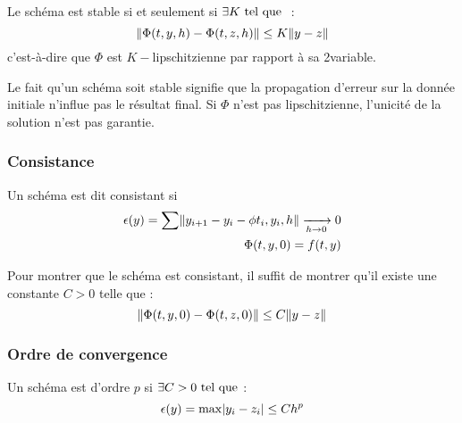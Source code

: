 			\begin{theoreme}
				Le schéma est stable si et seulement si $\exists K \text{ tel que }$ :
				\begin{equation}
					\label{eq-3-stableLip}
					\lVert \Phi(t,y,h) - \Phi(t,z,h) \rVert \leq K \lVert y-z \rVert
				\end{equation}
				c'est-à-dire que $\Phi$ est $K-$lipschitzienne par rapport à sa 2\ieme variable.
			\end{theoreme}

			Le fait qu'un schéma soit stable signifie que la propagation d'erreur sur la donnée initiale n'influe pas le résultat final. Si $\Phi$ n'est pas lipschitzienne, l'unicité de la solution n'est pas garantie.

		\subsubsection{Consistance}

			\begin{definition}[Consistance]
				Un schéma est dit consistant si
				\begin{align}
					\label{eq-3-consistance}
					\epsilon(y) = \sum \lVert y_{i+1} - y_i - \phi{t_i, y_i, h} \rVert \xrightarrow[h \to 0]{} 0	\\
					\Phi(t,y,0) = f(t,y)
				\end{align}
			\end{definition}

			\begin{theoreme}
				Pour montrer que le schéma est consistant, il suffit de montrer qu'il existe une constante $C>0$ telle que :
				\begin{equation}
					\label{eq-3-consistanceSuff}
					\lVert \Phi(t,y,0) - \Phi(t,z,0) \rVert \leq C \lVert y-z \rVert
				\end{equation}
			\end{theoreme}

		\subsubsection{Ordre de convergence}

			\begin{definition}
				Un schéma est d'ordre $p$ si $\exists C > 0 \text{ tel que } $:
				\begin{equation}
					\label{eq-3-ordre}
					\epsilon(y) = \max \lvert y_i - z_i \rvert \leq Ch^p	\\
				\end{equation}
			\end{definition}



